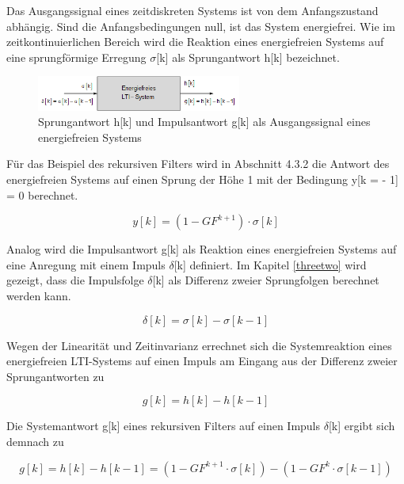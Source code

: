 \noindent Das Ausgangssignal eines zeitdiskreten Systems ist von dem Anfangszustand abh\"{a}ngig. Sind die Anfangsbedingungen null, ist das System energiefrei. Wie im zeitkontinuierlichen Bereich wird die Reaktion eines energiefreien Systems auf eine sprungf\"{o}rmige Erregung $\sigma$[k] als Sprungantwort h[k] bezeichnet.

\begin{figure}[H]
  \centerline{\includegraphics[width=0.6\textwidth]{Kapitel4/Bilder/image12.png}}
  \caption{Sprungantwort h[k] und Impulsantwort g[k] als Ausgangssignal eines energiefreien Systems}
  \label{fig:SystemSprungImpulsantwort}
\end{figure}

\noindent F\"{u}r das Beispiel des rekursiven Filters wird in Abschnitt 4.3.2 die Antwort des energiefreien Systems auf einen Sprung der H\"{o}he 1 mit der Bedingung y[k = - 1] = 0 berechnet.

\begin{equation}\label{eq:fourseventyeight}
y\left[k\right]=\left(1-GF^{k+1} \right)\cdot \sigma \left[k\right]
\end{equation}

\noindent Analog wird die Impulsantwort g[k] als Reaktion eines energiefreien Systems auf eine Anregung mit einem Impuls $\delta$[k] definiert. Im Kapitel \ref{threetwo} wird gezeigt, dass die Impulsfolge $\delta$[k] als Differenz zweier Sprungfolgen berechnet werden kann. 

\begin{equation}\label{eq:fourseventynine}
\delta \left[k\right]=\sigma \left[k\right]-\sigma \left[k-1\right]
\end{equation}

\noindent Wegen der Linearit\"{a}t und Zeitinvarianz errechnet sich die Systemreaktion eines energiefreien LTI-Systems auf einen Impuls am Eingang aus der Differenz zweier Sprungantworten zu

\begin{equation}\label{eq:foureighty}
g\left[k\right]=h\left[k\right]-h\left[k-1\right]
\end{equation}

\noindent Die Systemantwort g[k] eines rekursiven Filters auf einen Impuls $\delta$[k] ergibt sich demnach zu

\begin{equation}\label{eq:foureightyone}
g\left[k\right]=h\left[k\right]-h\left[k-1\right]=\left(1-GF^{k+1} \cdot \sigma \left[k\right]\right)-\left(1-GF^{k} \cdot \sigma \left[k-1\right]\right)
\end{equation}

